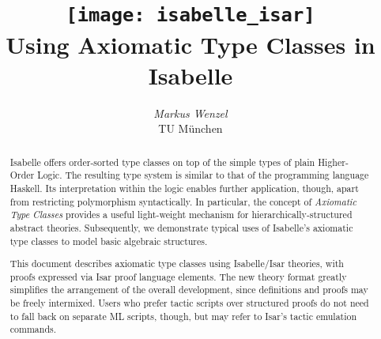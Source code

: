 \documentclass[12pt,a4paper,fleqn]{report}
\title{\texttt{[image: isabelle\_isar]}
  \\[4ex] Using Axiomatic Type Classes in Isabelle}
\author{\emph{Markus Wenzel} \\ TU M\"unchen}
\begin{document}
\underscoreoff

\maketitle 

\begin{abstract}
  Isabelle offers order-sorted type classes on top of the simple types of
  plain Higher-Order Logic.  The resulting type system is similar to that of
  the programming language Haskell.  Its interpretation within the logic
  enables further application, though, apart from restricting polymorphism
  syntactically.  In particular, the concept of \emph{Axiomatic Type Classes}
  provides a useful light-weight mechanism for hierarchically-structured
  abstract theories. Subsequently, we demonstrate typical uses of Isabelle's
  axiomatic type classes to model basic algebraic structures.
  
  This document describes axiomatic type classes using Isabelle/Isar theories,
  with proofs expressed via Isar proof language elements.  The new theory
  format greatly simplifies the arrangement of the overall development, since
  definitions and proofs may be freely intermixed.  Users who prefer tactic
  scripts over structured proofs do not need to fall back on separate ML
  scripts, though, but may refer to Isar's tactic emulation commands.
\end{abstract}


 \tableofcontents \clearfirst



\nocite{nipkow-types93}
\nocite{nipkow-sorts93}
\nocite{Wenzel:1997:TPHOL}
\nocite{paulson-isa-book}
\nocite{isabelle-isar-ref}
\nocite{Wenzel:1999:TPHOL}

\begingroup
   \small\raggedright\frenchspacing
  
\endgroup
\end{document}
